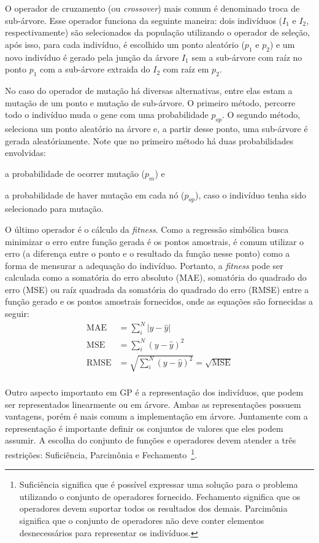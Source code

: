 \documentclass[a4paper]{article}
\begin{document}
O operador de cruzamento (ou \textit{crossover}) mais comum é denominado troca
de sub-árvore. Esse operador funciona da seguinte maneira: dois indivíduos
($I_1$ e $I_2$, respectivamente) são selecionados da população utilizando o
operador de seleção, após isso, para cada indivíduo, é escolhido um ponto
aleatório ($p_1$ e $p_2$) e um novo indivíduo é gerado pela junção da árvore
$I_1$ sem a sub-árvore com raíz no ponto $p_1$ com a sub-árvore extraida do
$I_2$ com raíz em $p_2$.

No caso do operador de mutação há diversas alternativas, entre elas estam a
mutação de um ponto e mutação de sub-árvore. O primeiro método, percorre todo o
indivíduo muda o gene com uma probabilidade $p_{op}$. O segundo método, seleciona
um ponto aleatório na árvore e, a partir desse ponto, uma sub-árvore é gerada
aleatóriamente. Note que no primeiro método há duas probabilidades envolvidas:
\begin{ilist}
\item a probabilidade de ocorrer mutação ($p_m$) e
\item a probabilidade de haver mutação em cada nó ($p_{op}$), caso o indivíduo
  tenha sido selecionado para mutação.
\end{ilist}

O último operador é o cálculo da \textit{fitness}. Como a regressão simbólica
busca minimizar o erro entre função gerada é os pontos amostrais, é comum
utilizar o erro (a diferença entre o ponto e o resultado da função nesse ponto)
como a forma de mensurar a adequação do indivíduo. Portanto, a \textit{fitness}
pode ser calculada como a somatória do erro absoluto (MAE), somatória do
quadrado do erro (MSE) ou raíz quadrada da somatória do quadrado do erro (RMSE)
entre a função gerado e os pontos amostrais fornecidos, onde as equações são
fornecidas a seguir:
\begin{align*}
  \textrm{MAE} &= \sum_{i}^{N}|y-\hat{y}| \\
  \textrm{MSE} &= \sum_{i}^{N}(y-\hat{y})^2 \\
  \textrm{RMSE} &= \sqrt{\sum_{i}^{N}(y-\hat{y})^2} = \sqrt{\textrm{MSE}}\\
\end{align*}

Outro aspecto importanto em GP é a representação dos indivíduos, que podem ser
representados linearmente ou em árvore. Ambas as representações possuem
vantagens, porém é mais comum a implementação em árvore. Juntamente com a
representação é importante definir os conjuntos de valores que eles podem
assumir. A escolha do conjunto de funções e operadores devem atender a três
restrições: Suficiência, Parcimônia e Fechamento~\footnote{Suficiência significa
que é possível expressar uma solução para o problema utilizando o conjunto de
operadores fornecido. Fechamento significa que os operadores devem suportar
todos os resultados dos demais. Parcimônia significa que o conjunto de
operadores não deve conter elementos desnecessários para representar os
indivíduos.}.
\end{document}
